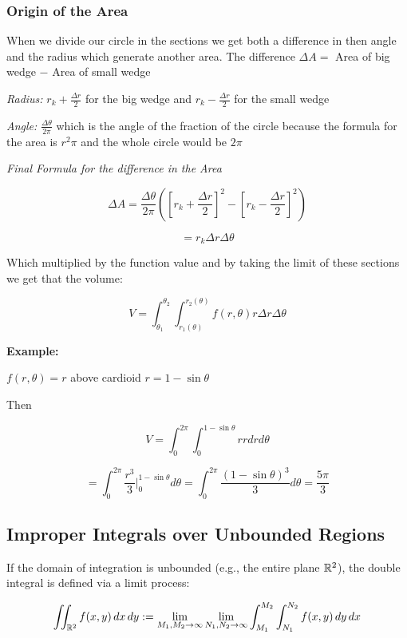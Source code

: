 \subsubsection{Origin of the Area}

When we divide our circle in the sections we get both a difference in then angle and the radius which 
generate another area. The difference \(\Delta A =\) Area of big wedge \(-\) Area of small wedge

\emph{Radius: }\(r_k + \frac{\Delta r}{2}\) for the big wedge and \(r_k - \frac{\Delta r}{2}\) for the 
small wedge

\emph{Angle: }\(\frac{\Delta \theta}{2 \pi}\) which is the angle of the fraction of the circle 
because the formula for the area is \(r^2 \pi\) and the whole circle would be \(2\pi\)

\emph{Final Formula for the difference in the Area}

\[
    \Delta A = \frac{\Delta \theta}{2 \pi} \left ( {\left[r_k + \frac{\Delta r}{2}\right]}^2 - 
    {\left[r_k - \frac{\Delta r}{2}\right]}^2\right)
\] 

\[ 
    = r_k \Delta r \Delta \theta
\]

Which multiplied by the function value and by taking the limit of these sections we get that the volume:

\[
    V = \int_{\theta_1}^{\theta_2} \int_{r_1 (\theta)}^{r_2 (\theta)} f(r, \theta) r \Delta r \Delta 
    \theta
\]

\textbf{Example:}

\(f(r, \theta) = r\) above cardioid \(r = 1 - \sin \theta\)

Then

\[
    V = \int_{0}^{2\pi}\int_{0}^{1 - \sin \theta} r r dr d\theta
\]

\[
    = \int_{0}^{2\pi}\frac{r^3}{3} |_{0}^{1 - \sin \theta} d\theta = \int_{0}^{2\pi} 
    \frac{{(1 - \sin\theta)}^3}{3} d\theta = \frac{5 \pi}{3}
\]

\subsection{Improper Integrals over Unbounded Regions}

If the domain of integration is unbounded (e.g., the entire plane \( \mathbb{R}^2 \)), the double integral is 
defined via a limit process:

\[
    \iint_{\mathbb{R}^2} f(x, y)\, dx\, dy := \lim_{M_1, M_2 \to \infty} \lim_{N_1, N_2 \to \infty}
    \int_{M_1}^{M_2} \int_{N_1}^{N_2} f(x, y)\, dy\, dx
\]


